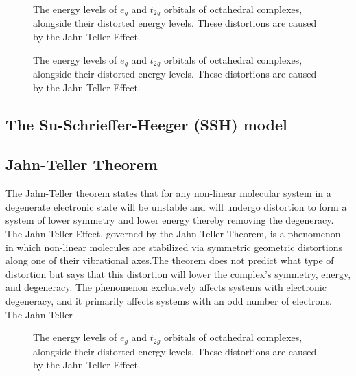 \documentclass[9pt,twocolumn,twoside]{optica}
\begin{document}
\begin{figure}[htbp]
\centering
{}
\caption{The energy levels of $e_g$ and $t_{2g}$ orbitals of octahedral complexes, alongside their distorted energy levels. These distortions are caused by the Jahn-Teller Effect.}
\label{fig:Jahn}
\end{figure}





\begin{figure}[htbp]
\centering
{}
\caption{The energy levels of $e_g$ and $t_{2g}$ orbitals of octahedral complexes, alongside their distorted energy levels. These distortions are caused by the Jahn-Teller Effect.}
\label{fig:Jahn}
\end{figure}






\subsection{The Su-Schrieffer-Heeger (SSH) model}












\subsection{Jahn-Teller Theorem}
The Jahn-Teller theorem states that for any non-linear molecular system in a degenerate electronic state will be unstable and will undergo distortion to form a system of lower symmetry and lower energy thereby removing the degeneracy. The Jahn-Teller Effect, governed by the Jahn-Teller Theorem, is a phenomenon in which non-linear molecules are stabilized via symmetric geometric distortions along one of their vibrational axes.The theorem does not predict what type of distortion but says  that this distortion will lower the complex's symmetry, energy, and degeneracy.
The phenomenon exclusively affects systems with electronic degeneracy, and it primarily affects systems with an odd number of electrons. The Jahn-Teller 

\begin{figure}[H]
\centering
{}
\caption{The energy levels of $e_g$ and $t_{2g}$ orbitals of octahedral complexes, alongside their distorted energy levels. These distortions are caused by the Jahn-Teller Effect.}
\label{fig:Jahn}
\end{figure}
\end{document}
